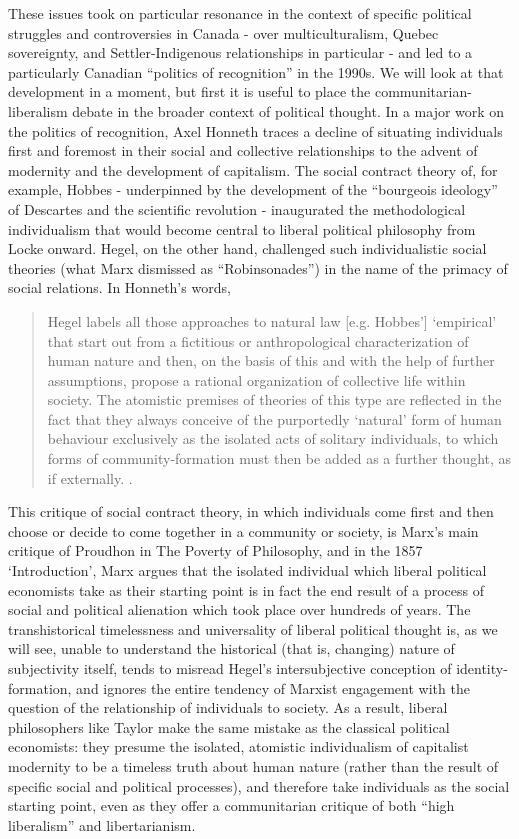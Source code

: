 \documentclass[12pt,oneside]{memoir}
\begin{document}
These issues took on particular resonance in the context of specific political struggles and controversies in Canada - over multiculturalism, Quebec sovereignty, and Settler-Indigenous relationships in particular - and led to a particularly Canadian ``politics of recognition'' in the 1990s. We will look at that development in a moment, but first it is useful to place the communitarian-liberalism debate in the broader context of political thought.
In a major work on the politics of recognition, Axel Honneth traces a decline of situating individuals first and foremost in their social and collective relationships to the advent of modernity and the development of capitalism. The social contract theory of, for example, Hobbes - underpinned by the development of the ``bourgeois ideology'' of Descartes and the scientific revolution - inaugurated the methodological individualism that would become central to liberal political philosophy from Locke onward. Hegel, on the other hand, challenged such individualistic social theories (what Marx dismissed as ``Robinsonades'') in the name of the primacy of social relations. In Honneth's words, 

\begin{quote}

Hegel labels all those approaches to natural law [e.g. Hobbes'] `empirical' that start out from a fictitious or anthropological characterization of human nature and then, on the basis of this and with the help of further assumptions, propose a rational organization of collective life within society. The atomistic premises of theories of this type are reflected in the fact that they always conceive of the purportedly `natural' form of human behaviour exclusively as the isolated acts of solitary individuals, to which forms of community-formation must then be added as a further thought, as if externally. \citep[12]{honneth-struggle}. 

\end{quote}

This critique of social contract theory, in which individuals come first and then choose or decide to come together in a community or society, is Marx's main critique of Proudhon in The Poverty of Philosophy, and in the 1857 `Introduction', Marx argues that the isolated individual which liberal political economists take as their starting point is in fact the end result of a process of social and political alienation which took place over hundreds of years. The transhistorical timelessness and universality of liberal political thought is, as we will see, unable to understand the historical (that is, changing) nature of subjectivity itself, tends to misread Hegel's intersubjective conception of identity-formation, and ignores the entire tendency of Marxist engagement with the question of the relationship of individuals to society. As a result, liberal philosophers like Taylor make the same mistake as the classical political economists: they presume the isolated, atomistic individualism of capitalist modernity to be a timeless truth about human nature (rather than the result of specific social and political processes), and therefore take individuals as the social starting point, even as they offer a communitarian critique of both ``high liberalism'' and libertarianism.
\end{document}
